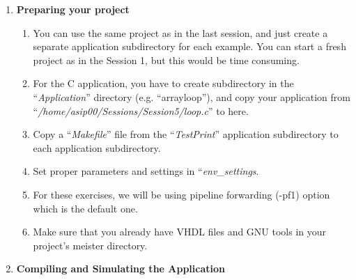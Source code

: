\documentclass[
]{article}
\begin{document}
\begin{enumerate}
\def\labelenumi{\arabic{enumi}.}
\item
  \textbf{Preparing your project}

  \begin{enumerate}
  \def\labelenumii{\arabic{enumii}.}
  \item
    You can use the same project as in the last session, and just create
    a separate application subdirectory for each example. You can start
    a fresh project as in the Session 1, but this would be time
    consuming.
  \item
    For the C application, you have to create subdirectory in the
    ``\emph{Application}'' directory (e.g. ``arrayloop''), and copy your
    application from ``\emph{/home/asip00/Sessions/Session5/loop.c}'' to
    here.
  \item
    Copy a ``\emph{Makefile}'' file from the ``\emph{TestPrint}''
    application subdirectory to each application subdirectory.
  \item
    Set proper parameters and settings in ``\emph{env\_settings}.
  \item
    For these exercises, we will be using pipeline forwarding (-pf1)
    option which is the default one.
  \item
    Make sure that you already have VHDL files and GNU tools in your
    project's meister directory.
  \end{enumerate}
\item
  \textbf{Compiling and Simulating the Application}


\end{enumerate}
\end{document}
